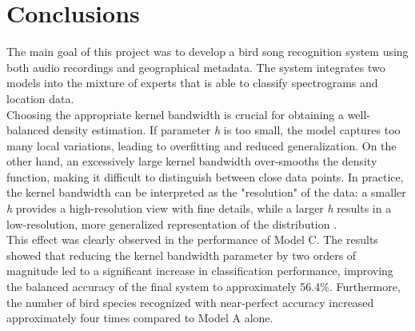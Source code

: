 \documentclass[runningheads]{llncs}
\begin{document}
\section*{Conclusions}

The main goal of this project was to develop a bird song recognition system using both audio recordings and geographical metadata. The system integrates two models into the mixture of experts that is able to classify spectrograms and location data. \\
\noindent Choosing the appropriate kernel bandwidth is crucial for obtaining a well-balanced density estimation. If parameter \textit{h} is too small, the model captures too many local variations, leading to overfitting and reduced generalization. On the other hand, an excessively large kernel bandwidth over-smooths the density function, making it difficult to distinguish between close data points. In practice, the kernel bandwidth can be interpreted as the "resolution" of the data: a smaller \textit{h} provides a high-resolution view with fine details, while a larger \textit{h} results in a low-resolution, more generalized representation of the distribution \cite{Combination_of__KDE_in_Classification}.\\
This effect was clearly observed in the performance of Model C. The results showed that reducing the kernel bandwidth parameter by two orders of magnitude led to a significant increase in classification performance, improving the balanced accuracy of the final system to approximately 56.4\%. Furthermore, the number of bird species recognized with near-perfect accuracy increased approximately four times compared to Model A alone.
\end{document}
